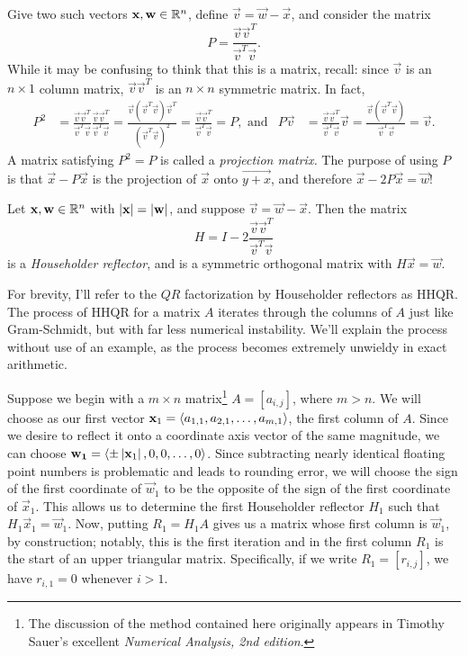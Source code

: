 \documentclass[m3380-lec-main.tex]{subfiles}
\begin{document}
Give two such vectors $\mathbf{x},\mathbf{w}\in\mathbb{R}^n$, define $\vec{v}=\vec{w}-\vec{x}$, and consider the matrix
\[P = \frac{\vec{v}\vec{v}^T}{\vec{v}^T\vec{v}}.\]
While it may be confusing to think that this is a matrix, recall: since $\vec{v}$ is an $n\times 1$ column matrix, $\vec{v}\vec{v}^T$ is an $n\times n$ symmetric matrix. In fact, 
\begin{align*} P^2 &= \frac{\vec{v}\vec{v}^T}{\vec{v}^T\vec{v}}\frac{\vec{v}\vec{v}^T}{\vec{v}^T\vec{v}} = \frac{\vec{v}(\vec{v}^T\vec{v})\vec{v}^T}{(\vec{v}^T\vec{v})^2} = \frac{\vec{v}\vec{v}^T}{\vec{v}^T\vec{v}} = P,
\text{ and} 
&
P\vec{v} &= \frac{\vec{v}\vec{v}^T}{\vec{v}^T\vec{v}}\vec{v} = \frac{\vec{v}(\vec{v}^T\vec{v})}{\vec{v}^T\vec{v}} = \vec{v}.
\end{align*}
A matrix satisfying $P^2=P$ is called a \emph{projection matrix.} The purpose of using $P$ is that $\vec{x}-P\vec{x}$ is the projection of $\vec{x}$ onto $\vec{y+x}$, and therefore $\vec{x}-2P\vec{x} = \vec{w}$!

\begin{thm} Let $\mathbf{x},\mathbf{w}\in\mathbb{R}^n$ with $\left|\mathbf{x}\right|=\left|\mathbf{w}\right|$, and suppose $\vec{v} = \vec{w}-\vec{x}$. Then the matrix
\[ H = I-2\frac{\vec{v}\vec{v}^T}{\vec{v}^T\vec{v}} \]
is a \emph{Householder reflector}, and is a symmetric orthogonal matrix with $H\vec{x}=\vec{w}$.
\end{thm} 

For brevity, I'll refer to the $QR$ factorization by Householder reflectors as HHQR. The process of HHQR for a matrix $A$ iterates through the columns of $A$ just like Gram-Schmidt, but with far less numerical instability. We'll explain the process without use of an example, as the process becomes extremely unwieldy in exact arithmetic.

Suppose we begin with a $m\times n$ matrix\footnote{The discussion of the method contained here originally appears in Timothy Sauer's excellent \emph{Numerical Analysis, 2nd edition}.} $A = [a_{i,j}]$, where $m>n$. We will choose as our first vector $\mathbf{x}_1 = \left\langle a_{1,1},a_{2,1},\ldots, a_{m,1}\right\rangle$, the first column of $A$. Since we desire to reflect it onto a coordinate axis vector of the same magnitude, we can choose $\mathbf{w_1}=\left\langle\pm\left|\mathbf{x}_1\right|,0,0,\ldots,0\right\rangle$. Since subtracting nearly identical floating point numbers is problematic and leads to rounding error, we will choose the sign of the first coordinate of $\vec{w}_1$ to be the opposite of the sign of the first coordinate of $\vec{x}_1$. This allows us to determine the first Householder reflector $H_1$ such that $H_1\vec{x}_1 = \vec{w}_1$. Now, putting $R_1 = H_1A$ gives us a matrix whose first column is $\vec{w}_1$, by construction; notably, this is the first iteration and in the first column $R_1$ is the start of an upper triangular matrix. Specifically, if we write $R_1=[r_{i,j}]$, we have $r_{i,1} = 0$ whenever $i>1$.
\end{document}
